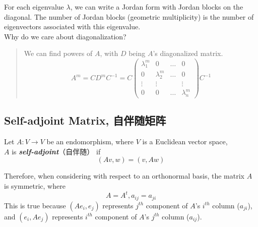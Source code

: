 For each eigenvalue $\lambda$, we can write a Jordan form with Jordan blocks on the diagonal. The number of Jordan blocks (geometric multiplicity) is the number of eigenvectors associated with this eigenvalue. \\
Why do we care about diagonalization?
\begin{quote}
    We can find powers of $A$, with $D$ being $A$'s diagonalized matrix. \\
    $$A^m = CD^mC^{-1} = C \begin{pmatrix}
        \lambda_1^m & 0 & \dots & 0 \\
        0 & \lambda_2^m & \dots & 0 \\
        \vdots & \vdots & & \vdots \\
        0 & 0 & \dots & \lambda_n^m
    \end{pmatrix} C^{-1}$$
\end{quote}

\subsection{Self-adjoint Matrix, 自伴随矩阵}
\begin{definition}
    Let $A: V \to V$ be an endomorphism, where $V$ is a Euclidean vector space, \\
    $A$ is \textbf{\textit{self-adjoint}}（自伴随） if
    $$(Av, w) = (v, Aw)$$
\end{definition}
Therefore, when considering with respect to an orthonormal basis, the matrix $A$ is symmetric, where
$$A = A^t, a_{ij} = a_{ji}$$
This is true because $(Ae_i, e_j)$ represents $j^{th}$ component of $A$'s $i^{th}$ column ($a_{ji}$), and $(e_i, Ae_j)$ represents $i^{th}$ component of $A$'s $j^{th}$ column ($a_{ij}$).

